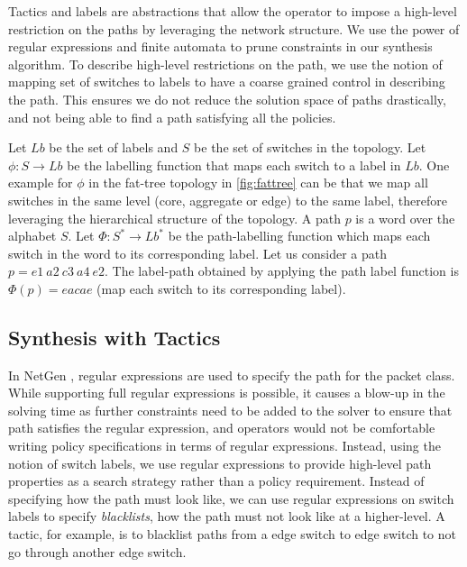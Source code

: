 Tactics and labels are abstractions that allow the operator to impose a high-level restriction on the paths by leveraging the network structure. We use the power of regular expressions and finite automata to prune constraints in our synthesis algorithm. To describe high-level restrictions on the path, we use the notion of mapping set of switches to labels to have a coarse grained control in describing the path. This ensures we do not reduce the solution space of paths drastically, and not being able to find a path satisfying all the policies.

 Let $Lb$ be the set of labels and $S$ be the set of switches in the topology. Let $\phi : S \rightarrow Lb$ be the labelling function that maps each switch to a label in $Lb$. One example for $\phi$ in the fat-tree topology in \cref{fig:fattree} can be that we map all switches in the same level (core, aggregate or edge) to the same label,
therefore leveraging the hierarchical structure of the topology. A path $p$ is a word over the alphabet $S$. Let $\Phi : S^* \rightarrow Lb^*$ be the path-labelling function which maps each switch in the word to its corresponding label. Let us consider a path $p = e1\ a2\ c3\ a4\ e2$. The label-path obtained by applying the path label function is $\Phi(p) = eacae$ (map each switch to its corresponding label).

\subsection{Synthesis with Tactics}
In NetGen \cite{netgen}, regular expressions are used to specify the path for the packet class.
While supporting full regular expressions is possible, it causes a blow-up in the solving time as further
constraints need to be added to the solver to ensure that path satisfies the regular expression, and operators would not be comfortable writing policy specifications in terms of regular expressions. Instead, using the notion of switch labels, we use regular expressions to provide high-level path properties as a search strategy rather than a policy requirement. Instead of specifying how the path must look like, we can use regular expressions on switch labels to specify \emph{blacklists}, how the path must not look like at a higher-level. A tactic, for example, is to blacklist paths from a edge switch to edge switch to not go through another edge switch. 
 
